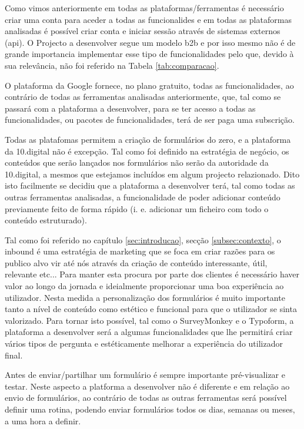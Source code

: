 Como vimos anteriormente em todas as plataformas/ferramentas é necessário criar uma conta para aceder a todas as funcionalides e em todas as plataformas analisadas é possível criar conta e iniciar sessão através de sistemas externos (\acrshort{api}). O Projecto a desenvolver segue um modelo \acrshort{b2b} e por isso mesmo não é de grande importancia implementar esse tipo de funcionalidades pelo que, devido à sua relevância, não foi referido na Tabela \ref{tab:comparacao}.

O plataforma da Google fornece, no plano gratuito, todas as funcionalidades, ao contrário de todas as ferramentas analisadas anteriormente, que, tal como se passará com a plataforma a desenvolver, para se ter acesso a todas as funcionalidades, ou pacotes de funcionalidades, terá de ser paga uma subscrição.

Todas as platafomas permitem a criação de formulários do zero, e a plataforma da 10.digital não é excepção. Tal como foi definido na estratégia de negócio, os conteúdos que serão lançados nos formulários não serão da autoridade da 10.digital, a mesmos que estejamos incluídos em algum projecto relazionado. Dito isto facilmente se decidiu que a plataforma a desenvolver terá, tal como todas as outras ferramentas analisadas, a funcionalidade de poder adicionar conteúdo previamente feito de forma rápido (i. e. adicionar um ficheiro com todo o conteúdo estruturado). 


Tal como foi referido no capítulo \ref{sec:introducao}, secção \ref{subsec:contexto}, o inbound é uma estratégia de marketing que se foca em criar razões para os publico alvo vir até nós através da criação de conteúdo interessante, útil, relevante etc... Para manter esta procura por parte dos clientes é necessário haver valor ao longo da jornada e ideialmente proporcionar uma boa experiência ao utilizador. Nesta medida a personalização dos formulários é muito importante tanto a nível de conteúdo como estético e funcional para que o utilizador se sinta valorizado. Para tornar isto possível, tal como o SurveyMonkey e o Typoform, a plataforma a desenvolver será a algumas funcionalidades que lhe permitirá criar vários tipos de pergunta e estéticamente melhorar a experiência do utilizador final.

Antes de enviar/partilhar um formulário é sempre importante pré-visualizar e testar. Neste aspecto a platforma a desenvolver não é diferente e em relação ao envio de formulários, ao contrário de todas as outras ferramentas será possível definir uma rotina, podendo enviar formulários todos os dias, semanas ou meses, a uma hora a definir.

